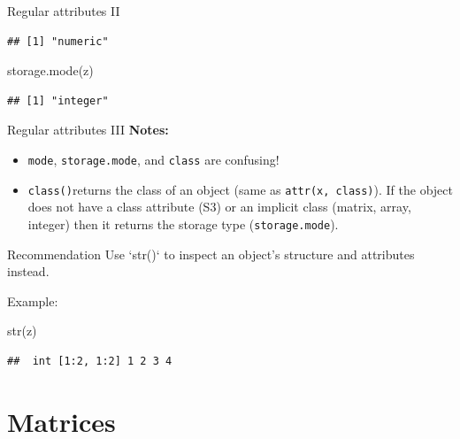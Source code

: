 \documentclass[
  9pt,
  ignorenonframetext,
]{beamer}
\newenvironment{Shaded}{\begin{snugshade}}{\end{snugshade}}
\newcommand{\KeywordTok}[1]{\textcolor[rgb]{0.94,0.87,0.69}{#1}}
\newcommand{\NormalTok}[1]{\textcolor[rgb]{0.80,0.80,0.80}{#1}}
\begin{document}
\begin{frame}[fragile]{Regular attributes II}
\begin{verbatim}
## [1] "numeric"
\end{verbatim}

\begin{Shaded}
\begin{Highlighting}[]
\KeywordTok{storage.mode}\NormalTok{(z)   }
\end{Highlighting}
\end{Shaded}

\begin{verbatim}
## [1] "integer"
\end{verbatim}
\end{frame}

\begin{frame}[fragile]{Regular attributes III}
\protect\hypertarget{regular-attributes-iii}{}
\textbf{Notes:}

\begin{itemize}
\item
  \texttt{mode}, \texttt{storage.mode}, and \texttt{class} are
  confusing!
\item
  \texttt{class()}returns the class of an object (same as
  \texttt{attr(x,\ \textquotesingle{}class\textquotesingle{})}). If the
  object does not have a class attribute (S3) or an implicit class
  (matrix, array, integer) then it returns the storage type
  (\texttt{storage.mode}).
\end{itemize}

\bigskip

\begin{block}{Recommendation}
Use `str()` to inspect an object's structure and attributes instead.
\end{block}

Example:

\begin{Shaded}
\begin{Highlighting}[]
\KeywordTok{str}\NormalTok{(z)}
\end{Highlighting}
\end{Shaded}

\begin{verbatim}
##  int [1:2, 1:2] 1 2 3 4
\end{verbatim}
\end{frame}

\hypertarget{matrices}{%
\section{Matrices}\label{matrices}}
\end{document}
